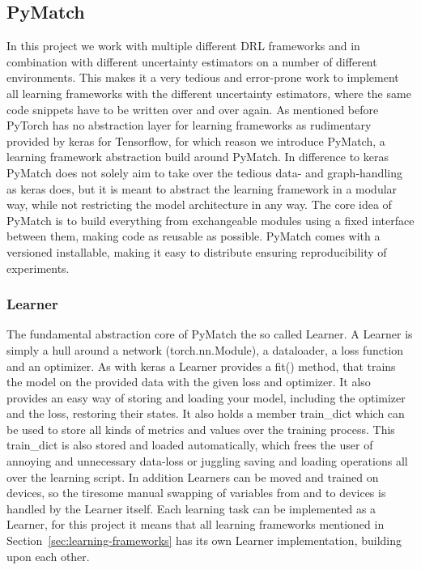 \documentclass[11pt,a4paper]{article}
\begin{document}
	\subsection{PyMatch}\label{subsec:pymatch}
	In this project we work with multiple different DRL frameworks and in combination with different uncertainty estimators on a number of different environments.
	This makes it a very tedious and error-prone work to implement all learning frameworks with the different uncertainty estimators, where the same code snippets have to be written over and over again.
	As mentioned before PyTorch has no abstraction layer for learning frameworks as rudimentary provided by keras for Tensorflow, for which reason we introduce PyMatch, a learning framework abstraction build around PyMatch.
	In difference to keras PyMatch does not solely aim to take over the tedious data- and graph-handling as keras does, but it is meant to abstract the learning framework in a modular way, while not restricting the model architecture in any way.
	The core idea of PyMatch is to build everything from exchangeable modules using a fixed interface between them, making code as reusable as possible.
	PyMatch comes with a versioned installable, making it easy to distribute ensuring reproducibility of experiments.\\

	\subsubsection{Learner}
	The fundamental abstraction core of PyMatch the so called Learner.
	A Learner is simply a hull around a network (torch.nn.Module), a dataloader, a loss function and an optimizer.
	As with keras a Learner provides a fit() method, that trains the model on the provided data with the given loss and optimizer.
	It also provides an easy way of storing and loading your model, including the optimizer and the loss, restoring their states.
	It also holds a member train\_dict which can be used to store all kinds of metrics and values over the training process.
	This train\_dict is also stored and loaded automatically, which frees the user of annoying and unnecessary data-loss or juggling saving and loading operations all over the learning script.
	In addition Learners can be moved and trained on devices, so the tiresome manual swapping of variables from and to devices is handled by the Learner itself.
	Each learning task can be implemented as a Learner, for this project it means that all learning frameworks mentioned in Section~\ref{sec:learning-frameworks} has its own Learner implementation, building upon each other.
\end{document}
